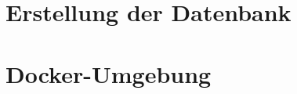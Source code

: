 \begin{appendices}
\section{Erstellung der Datenbank}

\section{Docker-Umgebung}




\end{appendices}
